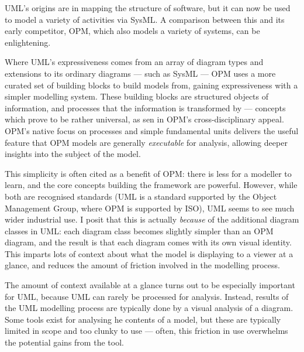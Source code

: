 \documentclass[draft]{article}
\begin{document}

UML's origins are in mapping the structure of software, but it can now be used
to model a variety of activities via SysML\cite{sysml_citations}. A comparison
between this and its early competitor, OPM\cite{opm_citations}, which also
models a variety of systems, can be enlightening.\par

Where UML's expressiveness comes from an array of diagram types and extensions
to its ordinary diagrams --- such as SysML --- OPM uses a more curated set of
building blocks to build models from, gaining expressiveness with a simpler
modelling system. These building blocks are structured objects of information,
and processes that the information is transformed by --- concepts which prove to
be rather universal, as sen in OPM's cross-disciplinary
appeal\cite{opm_rna_research}. OPM's native focus on processes and simple
fundamental units delivers the useful feature that OPM models are generally
\emph{executable} for analysis, allowing deeper insights into the subject of
the model.\par

This simplicity is often cited as a benefit of
OPM: there is less for a modeller to learn, and the core concepts building the
framework are powerful. However, while both are recognised standards (UML is a
standard supported by the Object Management Group, where OPM is supported by
ISO), UML seems to see much wider industrial use. I posit that this is actually
\emph{because} of the additional diagram classes in UML: each diagram class
becomes slightly simpler than an OPM diagram, and the result is that each
diagram comes with its own visual identity. This imparts lots of context about
what the model is displaying to a viewer at a glance, and reduces the amount of
friction involved in the modelling process.\par

The amount of context available at a glance turns out to be especially important
for UML, because UML can rarely be processed for analysis. Instead, results of
the UML modelling process are typically done by a visual analysis of a diagram.
Some tools exist for analysing he contents of a model\cite{eclipse_papyrus},
but these are typically limited in scope and too clunky to use --- often, this
friction in use overwhelms the potential gains from the tool.\par
\end{document}
